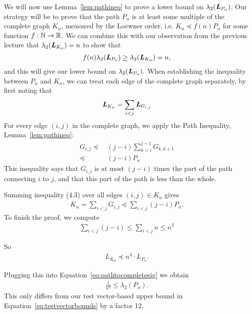 We will now use Lemma~\ref{lem:pathineq} to prove a lower bound on $\lambda_2(\boldsymbol{\mathit{L}}_{P_n})$.
Our strategy will be to prove that the path $P_n$ is at least some multiple of the
complete graph $K_n$, measured by the Loewner order, i.e. $K_n \preceq
f(n) P_n$ for some function $f: \mathbb{N} \to \mathbb{R}$.
We can combine this with our observation from the previous lecture
that $\lambda_2 (\boldsymbol{\mathit{L}}_{K_n}) = n$ to show that
\begin{align}
  \label{eq:pathtocompleteeig}
f(n) \lambda_2(\boldsymbol{\mathit{L}}_{P_n}) \geq \lambda_2(\boldsymbol{\mathit{L}}_{K_n}) = n,
\end{align}
and this will give our lower bound on $\lambda_2(\boldsymbol{\mathit{L}}_{P_n}).$
When establishing the inequality between $P_n$ and $K_n$, we can treat
each edge of the complete graph separately, by first noting that
\begin{align*}
\boldsymbol{\mathit{L}}_{K_n} = \sum_{i < j} \boldsymbol{\mathit{L}}_{G_{i,j}}
\end{align*}
For every edge $(i,j)$ in the complete graph, we apply the Path
Inequality, Lemma~\ref{lem:pathineq}:
\begin{align*}
  \label{eq:1}
G_{i,j}
\preceq & ~ (j-i) \sum_{k=i}^{j-1} G_{k,k+1} \\
\preceq & ~ (j-i) P_n
\end{align*}
This inequality says that $G_{i,j}$ is at most $(j-i)$ times the part of the path connecting $i$ to $j$, and that this part of the path is less than the whole.

Summing inequality (4.3) over all edges $(i,j) \in K_n$ gives
\begin{align*}
K_n = \sum_{i < j} G_{i,j} \preceq \sum_{i < j}  (j-i)P_n.
\end{align*}
To finish the proof, we compute
\begin{align*}
\sum_{i < j}  (j-i) \leq \sum_{i < j}  n \leq n^3
\end{align*}

So
\begin{align*}
L_{K_n} \preceq n^3 \cdot L_{P_n}.
\end{align*}

Plugging this into Equation~\eqref{eq:pathtocompleteeig}
we obtain
\begin{align*}
\frac{1}{ n^2 } \leq \lambda_2 (P_n).
\end{align*}
This only differs from our test vector-based upper bound in
Equation~\eqref{eq:testvectorbounds} by a factor 12.

